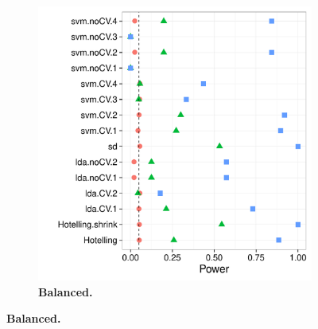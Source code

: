 \documentclass[12pt,a4paper]{article}
\begin{document}
\begin{figure}[h]
\begin{subfigure}{.5\textwidth}
		\includegraphics[width=1\linewidth]{"art/2016-07-27 11:42:05"}
		\caption{\textbf{Balanced.}} %
		\label{fig:simulation_12}
	\end{subfigure}
\end{figure}
\end{document}
